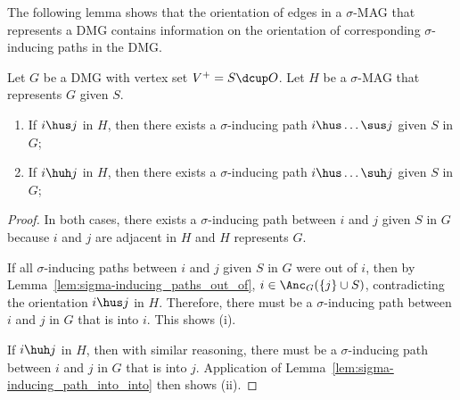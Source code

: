 The following lemma shows that the orientation of edges in a $\sigma$-MAG that represents a DMG contains information on the orientation of corresponding $\sigma$-inducing paths in the DMG.
\begin{Lem}\label{lem:sigma-inducing_path_into}
  Let $G$ be a DMG with vertex set $V^+ = S \dcup O$.
  Let $H$ be a $\sigma$-MAG that represents $G$ given $S$. 
  \begin{enumerate}[label=(\roman*)]
    \item If $i \hus j$ in $H$, then there exists a $\sigma$-inducing path $i \hus \dots \sus j$ given $S$ in $G$;
    \item If $i \huh j$ in $H$, then there exists a $\sigma$-inducing path $i \hus \dots \suh j$ given $S$ in $G$;
  \end{enumerate}
\end{Lem}
\begin{proof}
  In both cases, there exists a $\sigma$-inducing path between $i$ and $j$ given $S$ in $G$ because $i$ and $j$ are adjacent in $H$ and $H$ represents $G$.

  If all $\sigma$-inducing paths between $i$ and $j$ given $S$ in $G$ were out of $i$, then by Lemma~\ref{lem:sigma-inducing_paths_out_of}, $i \in \Anc_G(\{j\} \cup S)$, contradicting the orientation $i \hus j$ in $H$. 
  Therefore, there must be a $\sigma$-inducing path between $i$ and $j$ in $G$ that is into $i$.
  This shows (i).

  If $i \huh j$ in $H$, then with similar reasoning, there must be a $\sigma$-inducing path between $i$ and $j$ in $G$ that is into $j$.
  Application of Lemma~\ref{lem:sigma-inducing_path_into_into} then shows (ii).
\end{proof}

